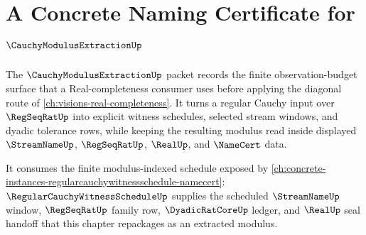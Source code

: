 \chapter{A Concrete Naming Certificate for $\CauchyModulusExtractionUp$}
\label{ch:concrete-instances-cauchymodulusextraction-namecert}

The $\CauchyModulusExtractionUp$ packet records the finite observation-budget surface that a Real-completeness consumer uses before applying the diagonal route of \autoref{ch:visions-real-completeness}. It turns a regular Cauchy input over $\RegSeqRatUp$ into explicit witness schedules, selected stream windows, and dyadic tolerance rows, while keeping the resulting modulus read inside displayed $\StreamNameUp$, $\RegSeqRatUp$, $\RealUp$, and $\NameCert$ data.

It consumes the finite modulus-indexed schedule exposed by \autoref{ch:concrete-instances-regularcauchywitnessschedule-namecert}: $\RegularCauchyWitnessScheduleUp$ supplies the scheduled $\StreamNameUp$ window, $\RegSeqRatUp$ family row, $\DyadicRatCoreUp$ ledger, and $\RealUp$ seal handoff that this chapter repackages as an extracted modulus.

